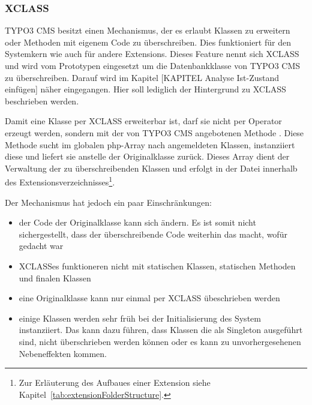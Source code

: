 \subsubsection{XCLASS}
TYPO3 CMS besitzt einen Mechanismus, der es erlaubt Klassen zu erweitern oder Methoden mit eigenem Code zu überschreiben. Dies funktioniert für den Systemkern wie auch für andere Extensions. Dieses Feature nennt sich XCLASS und wird vom Prototypen eingesetzt um die Datenbankklasse von TYPO3 CMS zu überschreiben. Darauf wird im Kapitel [KAPITEL Analyse Ist-Zustand einfügen] näher eingegangen. Hier soll lediglich der Hintergrund zu XCLASS beschrieben werden.

Damit eine Klasse per XCLASS erweiterbar ist, darf sie nicht per  Operator erzeugt werden, sondern mit der von TYPO3 CMS angebotenen Methode . Diese Methode sucht im globalen \gls{php}-Array  nach angemeldeten Klassen, instanziiert diese und liefert sie anstelle der Originalklasse zurück. Dieses Array dient der Verwaltung der zu überschreibenden Klassen und erfolgt in der Datei  innerhalb des Extensionsverzeichnisses\footnote{Zur Erläuterung des Aufbaues einer Extension siehe Kapitel~\ref{tab:extensionFolderStructure}.}.


Der Mechanismus hat jedoch ein paar Einschränkungen:

\begin{itemize}
	\itemsep1pt\parskip0pt
	\item
		der Code der Originalklasse kann sich ändern. Es ist somit nicht sichergestellt, dass der überschreibende Code weiterhin das macht, wofür gedacht war
	\item
		XCLASSes funktioneren nicht mit statischen Klassen, statischen Methoden und finalen Klassen
	\item
		eine Originalklasse kann nur einmal per XCLASS übeschrieben werden
	\item
		einige Klassen werden sehr früh bei der Initialisierung des System instanziiert. Das kann dazu führen, dass Klassen die als Singleton ausgeführt sind, nicht überschrieben werden können oder es kann zu unvorhergesehenen Nebeneffekten kommen.
\end{itemize}

